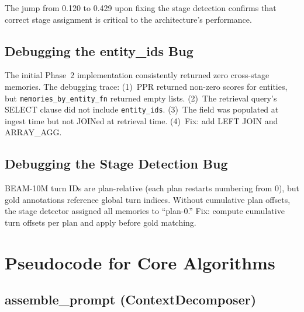 \documentclass[11pt]{article}
\begin{document}
The jump from 0.120 to 0.429 upon fixing the stage detection confirms
that correct stage assignment is critical to the architecture's
performance.

\subsection{Debugging the entity\_ids Bug}

The initial Phase~2 implementation consistently returned zero
cross-stage memories.  The debugging trace: (1)~PPR returned non-zero
scores for entities, but \texttt{memories\_by\_entity\_fn} returned
empty lists.  (2)~The retrieval query's SELECT clause did not include
\texttt{entity\_ids}.  (3)~The field was populated at ingest time but
not JOINed at retrieval time.  (4)~Fix: add LEFT JOIN and
ARRAY\_AGG.

\subsection{Debugging the Stage Detection Bug}

BEAM-10M turn IDs are plan-relative (each plan restarts numbering
from 0), but gold annotations reference global turn indices.  Without
cumulative plan offsets, the stage detector assigned all memories to
``plan-0.''  Fix: compute cumulative turn offsets per plan and apply
before gold matching.

\section{Pseudocode for Core Algorithms}
\label{app:pseudocode}

\subsection{assemble\_prompt (ContextDecomposer)}
\end{document}
